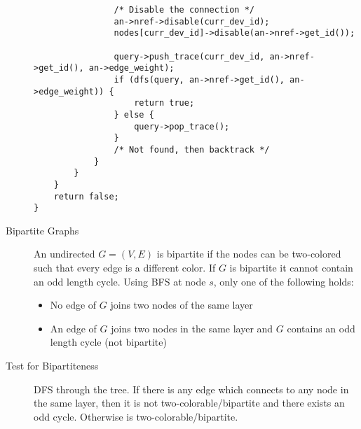 \documentclass[8pt]{article}
\begin{document}
\begin{multicols}{2}
\begin{description}
{\begin{verbatim}
                /* Disable the connection */
                an->nref->disable(curr_dev_id);
                nodes[curr_dev_id]->disable(an->nref->get_id());

                query->push_trace(curr_dev_id, an->nref->get_id(), an->edge_weight);
                if (dfs(query, an->nref->get_id(), an->edge_weight)) {
                    return true;
                } else {
                    query->pop_trace();
                }
                /* Not found, then backtrack */
            }
        }
    }
    return false;
}
\end{verbatim}
    }
  \item[Bipartite Graphs] An undirected $G=(V,E)$ is bipartite if the
    nodes can be two-colored such that every edge is a different
    color. If $G$ is bipartite it cannot contain an odd length
    cycle. Using BFS at node $s$, only one of the following holds:
    \begin{itemize}
    \item No edge of $G$ joins two nodes of the same layer
    \item An edge of $G$ joins two nodes in the same layer and $G$
      contains an odd length cycle (not bipartite)
    \end{itemize}
  \item[Test for Bipartiteness] DFS through the tree. If there is any
    edge which connects to any node in the same layer, then it is not
    two-colorable/bipartite and there exists an odd cycle. Otherwise
    is two-colorable/bipartite.
  \end{description} %
\end{multicols}
\end{document}
